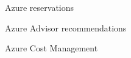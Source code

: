\begin{flashcard}[Understand]{Azure reservations}

\end{flashcard}

\begin{flashcard}[Understand]{Azure Advisor recommendations}

\end{flashcard}

\begin{flashcard}[Understand]{Azure Cost Management}

\end{flashcard}
